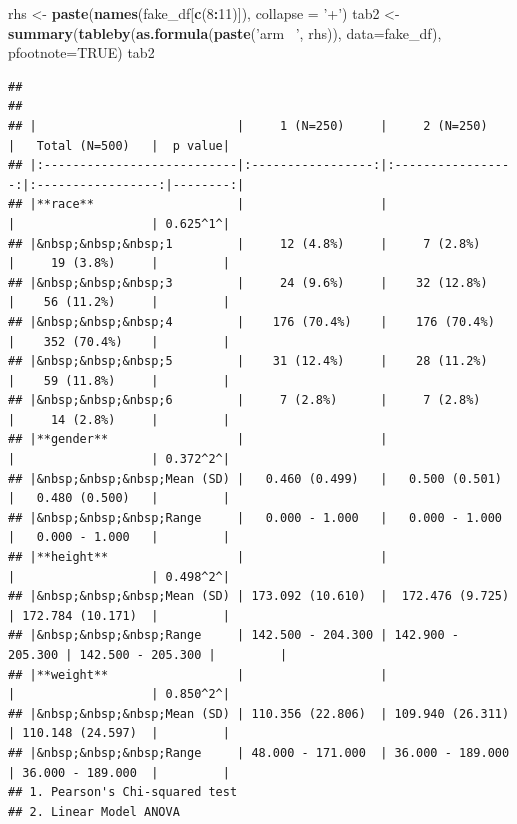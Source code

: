 \documentclass[
]{book}
\newenvironment{Shaded}{\begin{snugshade}}{\end{snugshade}}
\newcommand{\DataTypeTok}[1]{\textcolor[rgb]{0.13,0.29,0.53}{#1}}
\newcommand{\DecValTok}[1]{\textcolor[rgb]{0.00,0.00,0.81}{#1}}
\newcommand{\KeywordTok}[1]{\textcolor[rgb]{0.13,0.29,0.53}{\textbf{#1}}}
\newcommand{\NormalTok}[1]{#1}
\newcommand{\OperatorTok}[1]{\textcolor[rgb]{0.81,0.36,0.00}{\textbf{#1}}}
\newcommand{\OtherTok}[1]{\textcolor[rgb]{0.56,0.35,0.01}{#1}}
\newcommand{\StringTok}[1]{\textcolor[rgb]{0.31,0.60,0.02}{#1}}
\begin{document}
\begin{Shaded}
\begin{Highlighting}[]
\NormalTok{rhs <-}\StringTok{ }\KeywordTok{paste}\NormalTok{(}\KeywordTok{names}\NormalTok{(fake_df[}\KeywordTok{c}\NormalTok{(}\DecValTok{8}\OperatorTok{:}\DecValTok{11}\NormalTok{)]), }\DataTypeTok{collapse =} \StringTok{'+'}\NormalTok{)}
\NormalTok{tab2 <-}\StringTok{ }\KeywordTok{summary}\NormalTok{(}\KeywordTok{tableby}\NormalTok{(}\KeywordTok{as.formula}\NormalTok{(}\KeywordTok{paste}\NormalTok{(}\StringTok{'arm ~'}\NormalTok{, rhs)), }\DataTypeTok{data=}\NormalTok{fake_df), }\DataTypeTok{pfootnote=}\OtherTok{TRUE}\NormalTok{)}
\NormalTok{tab2}
\end{Highlighting}
\end{Shaded}

\begin{verbatim}
## 
## 
## |                            |     1 (N=250)     |     2 (N=250)     |   Total (N=500)   |  p value|
## |:---------------------------|:-----------------:|:-----------------:|:-----------------:|--------:|
## |**race**                    |                   |                   |                   | 0.625^1^|
## |&nbsp;&nbsp;&nbsp;1         |     12 (4.8%)     |     7 (2.8%)      |     19 (3.8%)     |         |
## |&nbsp;&nbsp;&nbsp;3         |     24 (9.6%)     |    32 (12.8%)     |    56 (11.2%)     |         |
## |&nbsp;&nbsp;&nbsp;4         |    176 (70.4%)    |    176 (70.4%)    |    352 (70.4%)    |         |
## |&nbsp;&nbsp;&nbsp;5         |    31 (12.4%)     |    28 (11.2%)     |    59 (11.8%)     |         |
## |&nbsp;&nbsp;&nbsp;6         |     7 (2.8%)      |     7 (2.8%)      |     14 (2.8%)     |         |
## |**gender**                  |                   |                   |                   | 0.372^2^|
## |&nbsp;&nbsp;&nbsp;Mean (SD) |   0.460 (0.499)   |   0.500 (0.501)   |   0.480 (0.500)   |         |
## |&nbsp;&nbsp;&nbsp;Range     |   0.000 - 1.000   |   0.000 - 1.000   |   0.000 - 1.000   |         |
## |**height**                  |                   |                   |                   | 0.498^2^|
## |&nbsp;&nbsp;&nbsp;Mean (SD) | 173.092 (10.610)  |  172.476 (9.725)  | 172.784 (10.171)  |         |
## |&nbsp;&nbsp;&nbsp;Range     | 142.500 - 204.300 | 142.900 - 205.300 | 142.500 - 205.300 |         |
## |**weight**                  |                   |                   |                   | 0.850^2^|
## |&nbsp;&nbsp;&nbsp;Mean (SD) | 110.356 (22.806)  | 109.940 (26.311)  | 110.148 (24.597)  |         |
## |&nbsp;&nbsp;&nbsp;Range     | 48.000 - 171.000  | 36.000 - 189.000  | 36.000 - 189.000  |         |
## 1. Pearson's Chi-squared test
## 2. Linear Model ANOVA
\end{verbatim}
\end{document}
